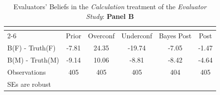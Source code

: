 \begin{table}[htbp]\centering
\caption{Evaluators' Beliefs in the \textit{Calculation} treatment of the \textit{Evaluator Study}: \textbf{Panel B}}
\begin{tabular}{l*{5}{c}}
\hline\hline
                &\multicolumn{5}{c}{}                             \\\cmidrule(lr){2-6}
                &\multicolumn{1}{c}{Prior}&\multicolumn{1}{c}{Overconf}&\multicolumn{1}{c}{Underconf}&\multicolumn{1}{c}{Bayes Post}&\multicolumn{1}{c}{Post}\\
\hline
B(F) - Truth(F) &    -7.81&    24.35&   -19.74&    -7.05&    -1.47\\
B(M) - Truth(M) &    -9.14&    10.06&    -8.81&    -8.42&    -4.64\\
\hline
Observations    &      405&      405&      405&      404&      405\\
\hline\hline
\multicolumn{6}{l}{\footnotesize SEs are robust}\\
\end{tabular}
\end{table}
